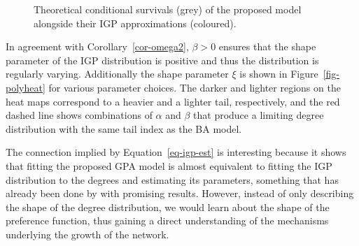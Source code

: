 \documentclass[
  sn-basic,
  10pt,
]{sn-jnl}
\theoremstyle{plain}
\theoremstyle{plain}
\theoremstyle{remark}
\begin{document}
\begin{figure}


\caption{\label{fig-approx_surv}Theoretical conditional survivals (grey)
of the proposed model alongside their IGP approximations (coloured).}

\end{figure}%

In agreement with Corollary~\ref{cor-omega2}, \(\beta>0\) ensures that
the shape parameter of the IGP distribution is positive and thus the
distribution is regularly varying. Additionally the shape parameter
\(\xi\) is shown in Figure~\ref{fig-polyheat} for various parameter
choices. The darker and lighter regions on the heat maps correspond to a
heavier and a lighter tail, respectively, and the red dashed line shows
combinations of \(\alpha\) and \(\beta\) that produce a limiting degree
distribution with the same tail index as the BA model.

The connection implied by Equation~\ref{eq-igp-est} is interesting
because it shows that fitting the proposed GPA model is almost
equivalent to fitting the IGP distribution to the degrees and estimating
its parameters, something that has already been done by \citet{Lee24}
with promising results. However, instead of only describing the shape of
the degree distribution, we would learn about the shape of the
preference function, thus gaining a direct understanding of the
mechanisms underlying the growth of the network.
\end{document}
